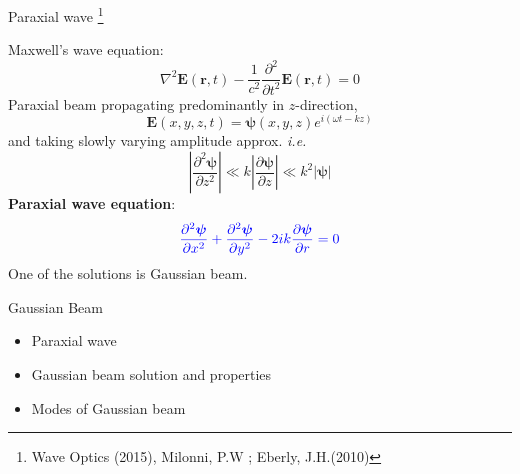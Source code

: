 \documentclass[12pt, dvipsnames]{beamer}
\numberwithin{equation}{section}
\newcommand\blfootnote[1]{%
	\begingroup
	\renewcommand\thefootnote{}\footnote{#1}%
	\addtocounter{footnote}{-1}%
	\endgroup
}
\begin{document}
\begin{frame}{Paraxial wave}\blfootnote{Wave Optics (2015), Milonni, P.W ; Eberly, J.H.(2010)}
	\vspace{-4pt}
	Maxwell's wave equation: 
	$$\nabla^2\boldsymbol{E}(\boldsymbol{r},t) - \frac{1}{c^2} \frac{\partial^2}{\partial t^2} \boldsymbol{E}(\boldsymbol{r},t)=0$$\pause
	Paraxial beam propagating predominantly in $z$-direction, $$\boldsymbol{E}(x,y,z,t)= \boldsymbol{\psi}(x,y,z) e^{i(\omega t-kz)}$$\pause
	and taking slowly varying amplitude approx. \textit{i.e.}  $$\left|\frac{\partial^2\boldsymbol{\psi}}{\partial z^2}\right|\ll k \left|\frac{\partial\boldsymbol{\psi}}{\partial z}\right| \ll
	k^2\left|\boldsymbol{\psi}\right|$$\pause
	\textbf{Paraxial wave equation}:
	$${\color{blue}\frac{\partial^2\boldsymbol{\psi}}{\partial x^2}+\frac{\partial^2\boldsymbol{\psi}}{\partial y^2} -2ik \frac{\partial\boldsymbol{\psi}}{\partial r}=0}$$\pause
	One of the solutions is \alert{\Large Gaussian beam}.\vspace{6pt}
\end{frame}

\begin{frame}%
	\centering
	\alert{\huge Gaussian Beam}
	\begin{itemize}\Large
		\item<0>Paraxial wave
		\item<1>Gaussian beam solution and properties
		\item<0>Modes of Gaussian beam
	\end{itemize}
\end{frame}
\end{document}
